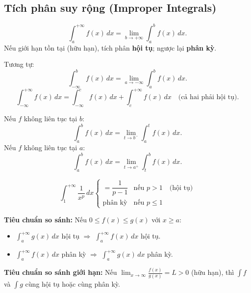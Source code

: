 \documentclass[12pt,a4paper]{article}
\begin{document}
\subsection{Tích phân suy rộng (Improper Integrals)}

\begin{dinhnghia}[title={Tích phân suy rộng loại 1 (Cận vô cực)}]
  \[
    \int_a^{+\infty} f(x)\,dx = \lim_{b \to +\infty} \int_a^b f(x)\,dx.
  \]
  Nếu giới hạn tồn tại (hữu hạn), tích phân \textbf{hội tụ}; ngược lại \textbf{phân kỳ}.

  Tương tự:
  \[
    \int_{-\infty}^b f(x)\,dx = \lim_{a \to -\infty} \int_a^b f(x)\,dx.
  \]
  \[
    \int_{-\infty}^{+\infty} f(x)\,dx = \int_{-\infty}^c f(x)\,dx + \int_c^{+\infty} f(x)\,dx \quad \text{(cả hai phải hội tụ)}.
  \]
\end{dinhnghia}

\begin{dinhnghia}[title={Tích phân suy rộng loại 2 (Hàm bị gián đoạn)}]
  Nếu $f$ không liên tục tại $b$:
  \[
    \int_a^b f(x)\,dx = \lim_{t \to b^-} \int_a^t f(x)\,dx.
  \]
  Nếu $f$ không liên tục tại $a$:
  \[
    \int_a^b f(x)\,dx = \lim_{t \to a^+} \int_t^b f(x)\,dx.
  \]
\end{dinhnghia}

\begin{dinhly}[title={Tích phân $p$}]
  \[
    \int_1^{+\infty} \frac{1}{x^p}\,dx \begin{cases} = \dfrac{1}{p-1} & \text{nếu } p > 1 \quad \text{(hội tụ)} \\ \text{phân kỳ} & \text{nếu } p \le 1 \end{cases}
  \]
\end{dinhly}

\begin{phuongphap}[title={Kiểm tra hội tụ bằng so sánh}]
  \textbf{Tiêu chuẩn so sánh:} Nếu $0 \le f(x) \le g(x)$ với $x \ge a$:
  \begin{itemize}
    \item $\displaystyle\int_a^{+\infty} g(x)\,dx$ hội tụ $\Rightarrow$ $\displaystyle\int_a^{+\infty} f(x)\,dx$ hội tụ.
    \item $\displaystyle\int_a^{+\infty} f(x)\,dx$ phân kỳ $\Rightarrow$ $\displaystyle\int_a^{+\infty} g(x)\,dx$ phân kỳ.
  \end{itemize}
  \textbf{Tiêu chuẩn so sánh giới hạn:} Nếu $\displaystyle\lim_{x\to\infty} \frac{f(x)}{g(x)} = L > 0$ (hữu hạn), thì $\int f$ và $\int g$ cùng hội tụ hoặc cùng phân kỳ.
\end{phuongphap}
\end{document}
